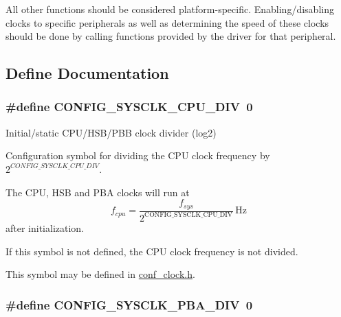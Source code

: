 \-All other functions should be considered platform-\/specific. \-Enabling/disabling clocks to specific peripherals as well as determining the speed of these clocks should be done by calling functions provided by the driver for that peripheral. 

\subsection{\-Define \-Documentation}
\hypertarget{group__sysclk__group_gaf8bcf7e1ee2ebd2829ebc31be507c6da}{
\subsubsection[{\-C\-O\-N\-F\-I\-G\-\_\-\-S\-Y\-S\-C\-L\-K\-\_\-\-C\-P\-U\-\_\-\-D\-I\-V}]{\setlength{\rightskip}{0pt plus 5cm}\#define \-C\-O\-N\-F\-I\-G\-\_\-\-S\-Y\-S\-C\-L\-K\-\_\-\-C\-P\-U\-\_\-\-D\-I\-V~0}}
\label{group__sysclk__group_gaf8bcf7e1ee2ebd2829ebc31be507c6da}


\-Initial/static \-C\-P\-U/\-H\-S\-B/\-P\-B\-B clock divider (log2) 

\-Configuration symbol for dividing the \-C\-P\-U clock frequency by $2^{CONFIG\_SYSCLK\_CPU\_DIV}$.

\-The \-C\-P\-U, \-H\-S\-B and \-P\-B\-A clocks will run at \[ f_{cpu} = \frac{f_{sys}}{2^\mathrm{CONFIG\_SYSCLK\_CPU\_DIV}}\,\mbox{Hz} \] after initialization.

\-If this symbol is not defined, the \-C\-P\-U clock frequency is not divided.

\-This symbol may be defined in \hyperlink{conf__clock_8h}{conf\-\_\-clock.\-h}. \hypertarget{group__sysclk__group_gaa952d8094a06be420e244e68286c2dbf}{
\subsubsection[{\-C\-O\-N\-F\-I\-G\-\_\-\-S\-Y\-S\-C\-L\-K\-\_\-\-P\-B\-A\-\_\-\-D\-I\-V}]{\setlength{\rightskip}{0pt plus 5cm}\#define \-C\-O\-N\-F\-I\-G\-\_\-\-S\-Y\-S\-C\-L\-K\-\_\-\-P\-B\-A\-\_\-\-D\-I\-V~0}}
\label{group__sysclk__group_gaa952d8094a06be420e244e68286c2dbf}


